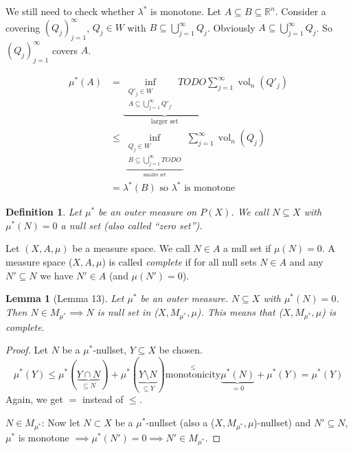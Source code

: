 \documentclass{article}
\newtheorem{definition}{Definition}  \numberwithin{definition}{section}
\newtheorem{lemma}{Lemma}  \numberwithin{lemma}{section}
\begin{document}
We still need to check whether $\lambda^*$ is monotone.
Let $A \subseteq B \subseteq \mathbb R^n$.
Consider a covering $(Q_j)_{j=1}^\infty$, $Q_j \in W$ with $B \subseteq \bigcup_{j=1}^\infty Q_j$.
Obviously $A \subseteq \bigcup_{j=1}^\infty Q_j$.
So $(Q_j)_{j=1}^\infty$ covers $A$.

\begin{align*}
  \mu^*(A)
    &= \underbrace{\inf_{\substack{Q'_j \in W \\ A \subseteq \bigcup_{j=1}^\infty {Q'}_{j'}}} TODO}_{\text{larger set}}
      \sum_{j=1}^\infty \operatorname{vol}_n(Q'_j) \\
    &\leq \inf_{\underbrace{\substack{Q_j \in W \\ B \subseteq \bigcup_{j=1}^\infty TODO}}_{\text{smaller set}}}
      \sum_{j=1}^\infty \operatorname{vol}_n(Q_j)  \\
    &= \lambda^*(B) \text{ so } \lambda^* \text{ is monotone}
\end{align*}

\begin{definition}
  Let $\mu^*$ be an outer measure on $P(X)$.
  We call $N \subseteq X$ with $\mu^*(N) = 0$ a \emph{null set} (also called \enquote{zero set}).
\end{definition}

Let $(X, A, \mu)$ be a measure space. We call $N \in A$ a null set if $\mu(N) = 0$.
A measure space ($X, A, \mu$) is called \emph{complete} if for all null sets $N \in A$
and any $N' \subseteq N$ we have $N' \in A$ (and $\mu(N') = 0$).

\begin{lemma}[Lemma 13]
  Let $\mu^*$ be an outer measure. $N \subseteq X$ with $\mu^*(N) = 0$.
  Then $N \in M_{\mu^*} \implies N$ is null set in ($X, M_{\mu^*}, \mu$).
  This means that ($X, M_{\mu^*}, \mu$) is complete.
\end{lemma}
\begin{proof}
  Let $N$ be a $\mu^*$-nullset, $Y \subseteq X$ be chosen.
  \[
      \mu^*(Y)
        \leq \mu^*(\underbrace{Y \cap N}_{\subseteq N}) + \mu^*(\underbrace{Y \setminus N}_{\subseteq Y})
        \stackrel{\leq}{\text{monotonicity}} \underbrace{\mu^*(N)}_{=0} + \mu^*(Y) = \mu^*(Y)
  \]
  Again, we get $=$ instead of $\leq$.

  $N \in M_{\mu^*}$:
  Now let $N \subset X$ be a $\mu^*$-nullset (also a ($X, M_{\mu^*}, \mu$)-nullset)
  and $N' \subseteq N$, $\mu^*$ is monotone
  $\implies \mu^*(N') = 0 \implies N' \in M_{\mu^*}$.
\end{proof}
\end{document}
